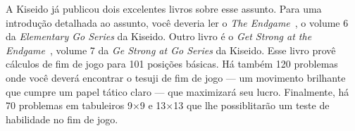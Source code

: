 A Kiseido já publicou dois excelentes livros sobre esse assunto. Para uma introdução detalhada ao assunto, você deveria ler o \emph{The Endgame}~\cite{tomoko_bozulich_endgame}, o volume 6 da \emph{Elementary Go Series} da Kiseido. Outro livro é o \emph{Get Strong at the Endgame}~\cite{bozulich_endgame}, volume 7 da \emph{Ge Strong at Go Series} da Kiseido. Esse livro provê cálculos de fim de jogo para 101 posições básicas. Há também 120 problemas onde você deverá encontrar o tesuji de fim de jogo --- um movimento brilhante que cumpre um papel tático claro --- que maximizará seu lucro. Finalmente, há 70 problemas em tabuleiros 9\(\times\)9 e 13\(\times\)13 que lhe possiblitarão um teste de habilidade no fim de jogo.